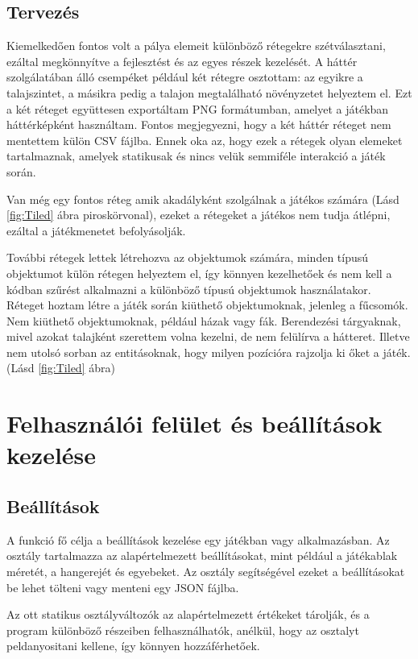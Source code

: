 \subsection{Tervezés} \label{subsec:Tervezés}

 Kiemelkedően fontos volt a pálya elemeit különböző rétegekre szétválasztani, ezáltal megkönnyítve a fejlesztést és az egyes részek kezelését. A háttér szolgálatában álló csempéket például két rétegre osztottam: az egyikre a talajszintet, a másikra pedig a talajon megtalálható növényzetet helyeztem el. Ezt a két réteget együttesen exportáltam PNG formátumban, amelyet a játékban háttérképként használtam. Fontos megjegyezni, hogy a két háttér réteget nem mentettem külön CSV fájlba. Ennek oka az, hogy ezek a rétegek olyan elemeket tartalmaznak, amelyek statikusak és nincs velük semmiféle interakció a játék során. 

Van még egy fontos réteg amik akadályként szolgálnak a játékos számára (Lásd \ref{fig:Tiled} ábra piroskörvonal), ezeket a rétegeket a játékos nem tudja átlépni, ezáltal a játékmenetet befolyásolják.  

További rétegek lettek létrehozva az objektumok számára, minden típusú objektumot külön rétegen helyeztem el, így könnyen kezelhetőek és nem kell a kódban szűrést alkalmazni a különböző típusú objektumok használatakor.
Réteget hoztam létre a játék során kiüthető objektumoknak, jelenleg a fűcsomók. Nem kiüthető objektumoknak, például házak vagy fák. Berendezési tárgyaknak, mivel azokat talajként szerettem volna kezelni, de nem felülírva a hátteret. Illetve nem utolsó sorban az entitásoknak, hogy milyen pozícióra rajzolja ki őket a játék. (Lásd \ref{fig:Tiled} ábra)

\section{Felhasználói felület és beállítások kezelése}

\subsection{Beállítások}
 A funkció fő célja a beállítások kezelése egy játékban vagy alkalmazásban. Az osztály tartalmazza az alapértelmezett beállításokat, mint például a játékablak méretét, a hangerejét és egyebeket. Az osztály segítségével ezeket a beállításokat be lehet tölteni vagy menteni egy JSON fájlba.

Az ott statikus osztályváltozók az alapértelmezett értékeket tárolják, és a program különböző részeiben felhasználhatók, anélkül, hogy az osztalyt peldanyositani kellene, így könnyen hozzáférhetőek.

